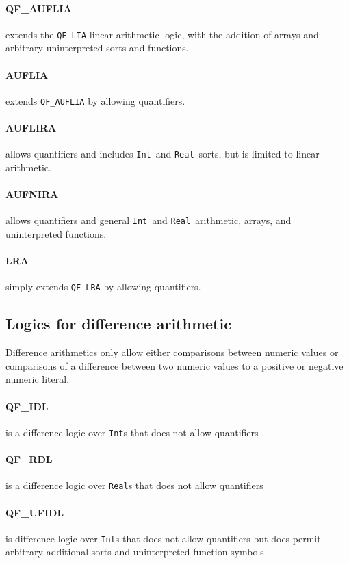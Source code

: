 \documentclass[12pt,oneside]{report}
\newcommand{\Int}{{\tt Int}}
\newcommand{\Real}{{\tt Real}}
\begin{document}
\paragraph{QF\_AUFLIA} extends the {\tt QF\_LIA} linear arithmetic logic, with the addition of arrays and arbitrary
uninterpreted sorts and functions.

\paragraph{AUFLIA} extends {\tt QF\_AUFLIA} by allowing quantifiers.

\paragraph{AUFLIRA} allows quantifiers and includes \Int\ and \Real\ sorts, but is
limited to linear arithmetic.

\paragraph{AUFNIRA} allows quantifiers and general \Int\ and \Real\ arithmetic, arrays, and uninterpreted functions.

\paragraph{LRA} simply extends {\tt QF\_LRA} by allowing quantifiers.

\subsection{Logics for difference arithmetic}

Difference arithmetics only allow either comparisons between numeric values or
comparisons of a difference between two numeric values to a positive or negative
numeric literal.

\paragraph{QF\_IDL} is a difference logic over \Int s that does not allow quantifiers

\paragraph{QF\_RDL} is a difference logic over \Real s that does not allow quantifiers 

\paragraph{QF\_UFIDL} is difference logic over \Int s that does not allow quantifiers
but does permit arbitrary additional sorts and uninterpreted function symbols
\end{document}
